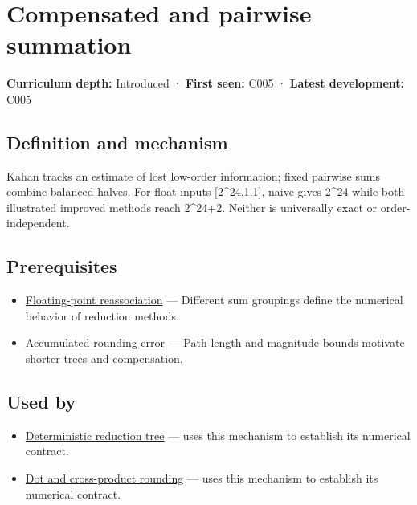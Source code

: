 \hypertarget{appendix-df318da57389}{}
\section{Compensated and pairwise summation}\label{appendix-df318da57389-compensated-and-pairwise-summation}

\textbf{Curriculum depth:} Introduced · \textbf{First seen:} C005 · \textbf{Latest development:} C005

\subsection{Definition and mechanism}\label{appendix-df318da57389-definition-and-mechanism}

Kahan tracks an estimate of lost low-order information; fixed pairwise sums combine balanced halves. For float inputs {[}2\^{}24,1,1{]}, naive gives 2\^{}24 while both illustrated improved methods reach 2\^{}24+2. Neither is universally exact or order-independent.

\subsection{Prerequisites}\label{appendix-df318da57389-prerequisites}

\begin{itemize}
\tightlist
\item
  \hyperref[appendix-c2ac4a84c283]{Floating-point reassociation} --- Different sum groupings define the numerical behavior of reduction methods.
\item
  \hyperref[appendix-f82e270791c8]{Accumulated rounding error} --- Path-length and magnitude bounds motivate shorter trees and compensation.
\end{itemize}

\subsection{Used by}\label{appendix-df318da57389-used-by}

\begin{itemize}
\tightlist
\item
  \hyperref[appendix-4c8e0238e7ee]{Deterministic reduction tree} --- uses this mechanism to establish its numerical contract.
\item
  \hyperref[appendix-5aef4f13483a]{Dot and cross-product rounding} --- uses this mechanism to establish its numerical contract.
\end{itemize}

